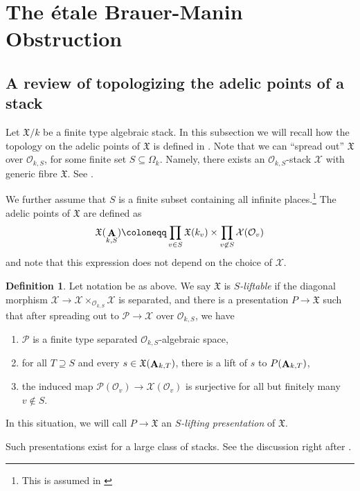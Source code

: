 \documentclass[12pt, final]{amsart}
\theoremstyle{remark}
\theoremstyle{definition}
\newtheorem{definition}[example]{Definition}
\theoremstyle{plain}
\newcommand{\sO}{\mathcal{O}}
\newcommand{\fX}{{\mathfrak X}}
\DeclareMathOperator{\bA}{{\bf A}}
\begin{document}
\section{The \'etale Brauer-Manin Obstruction}\label{sec:ebm}

\subsection{A review of topologizing the adelic points of a stack}




Let $\fX/k$ be a finite type algebraic stack. In this subsection we will recall how the topology on the adelic points of $\fX$ is defined in \cite[Section 2]{Dhillon:25}. 
Note that we can ``spread out'' $\fX$ over $\sO_{k,S}$, for some finite set $S\subseteq \Omega_k$. Namely, there exists an $\sO_{k,S}$-stack $\mathcal{X}$ with generic fibre $\fX$. See \cite[Theorem 4.2]{Dhillon:25}. 


We further assume that $S$ is a finite subset containing all infinite places.\footnote{This is assumed in \cite[Definition 2.14]{Dhillon:25}} 
The adelic points of $\fX$ are defined as 
$$
    \fX(\bA_{k,S}) \coloneqq \prod_{v\in S} \fX(k_v) \times \prod_{v\not\in S} \mathcal{X}(\sO_{v}) 
$$ and note that this expression does not depend on the choice of $\mathcal{X}$.

\begin{definition}
    \label{d:lifting-presentation} Let notation be as above. We say $\fX$ is \emph{$S$-liftable} if the diagonal morphism $\mathcal{X} \to \mathcal{X} \times_{\sO_{k,S}} \mathcal{X}$ is separated, and there is a presentation $P\to \fX$ such that after spreading 
    out to $\mathcal{P} \to \mathcal{X}$ over $\sO_{k,S}$, we have
    \begin{enumerate}
        \item $\mathcal{P}$ is a finite type separated $\sO_{k,S}$-algebraic space,
        \item for all $T\supseteq S$ and every $s\in \fX(\bA_{k,T})$, there is a lift of $s$ to $P(\bA_{k,T})$,
        \item the induced map $\mathcal{P}(\sO_{v})\to \mathcal{X}(\sO_{v})$ is surjective for all but finitely many $v\not\in S$. 
    \end{enumerate}
    In this situation, we will call $P\to \fX$ an \emph{$S$-lifting presentation} of $\fX$. 
\end{definition}\noindent Such presentations exist for a large class of stacks. See the discussion right after \cite[Definition 2.14]{Dhillon:25}.    
\end{document}
